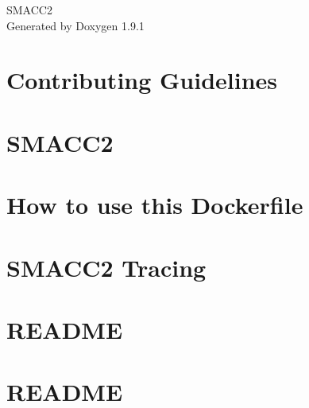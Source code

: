 \let\mypdfximage\pdfximage\def\pdfximage{\immediate\mypdfximage}\documentclass[twoside]{book}
\newcommand{\+}{\discretionary{\mbox{\scriptsize$\hookleftarrow$}}{}{}}
\newcommand{\clearemptydoublepage}{%
  \newpage{\pagestyle{empty}\cleardoublepage}%
}
\begin{document}
\raggedbottom

\hypersetup{pageanchor=false,
             bookmarksnumbered=true,
             pdfencoding=unicode
            }
\begin{titlepage}
\vspace*{7cm}
\begin{center}%
{\Large SMACC2 }\\
\vspace*{1cm}
{\large Generated by Doxygen 1.9.1}\\
\end{center}
\end{titlepage}
\clearemptydoublepage
{}
\tableofcontents
\clearemptydoublepage
{}
\hypersetup{pageanchor=true}

\chapter{Contributing Guidelines}
\label{md_CONTRIBUTING}

\chapter{SMACC2}
\label{md_README}

\chapter{How to use this Dockerfile}
\label{md_smacc2_ci_docker_ros_rollingAndGalactic_ubuntu_20_04_README}

\chapter{SMACC2 Tracing}
\label{md_smacc2_performance_tools_tracing_tools_README}

\chapter{README}
\label{md_smacc2_sm_reference_library_sm_advanced_recovery_1_README}

\chapter{README}
\label{md_smacc2_sm_reference_library_sm_atomic_README}

\end{document}
